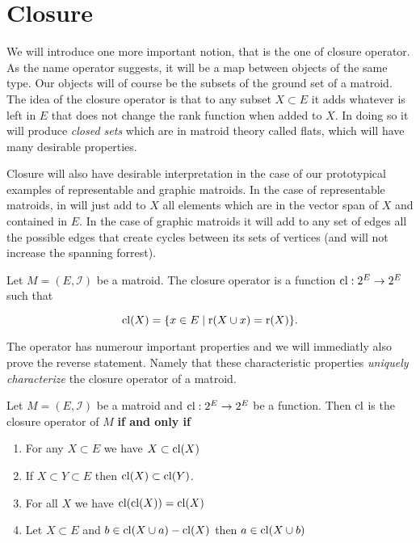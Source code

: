 \section{Closure}


We will introduce one more important notion, that is the one of closure operator. As the name operator suggests, it will be a map between objects of the same type. Our objects will of course be the subsets of the ground set of a matroid. The idea of the closure operator is that to any subset $X \subset E$ it adds whatever is left in $E$ that does not change the rank function when added to $X$. In doing so it will produce \textit{closed sets} which are in matroid theory called flats, which will have many desirable properties. 

Closure will also have desirable interpretation in the case of our prototypical examples of representable and graphic matroids. In the case of representable matroids, in will just add to $X$ all elements which are in the vector span of $X$ and contained in $E$. In the case of graphic matroids it will add to any set of edges all the possible edges that create cycles between its sets of vertices (and will not increase the spanning forrest).

\begin{defn}
    Let $M = (E, \mathcal{I})$ be a matroid. The closure operator is a function $\mathrm{cl}: 2^E \to 2^E$ such that

    $$\mathrm{cl}(X) = \{x \in E\; | \; \text{r}(X \cup x) = \text{r}(X) \}.$$

    
\end{defn}

The operator has numerour important properties and we will immediatly also prove the reverse statement. Namely that these characteristic properties \textit{uniquely characterize} the closure operator of a matroid.

\begin{theorem}
Let $M = (E, \mathcal{I})$ be a matroid and $\mathrm{cl}: 2^E \to 2^E$ be a function. Then $\mathrm{cl}$ is the closure operator of $M$ \textbf{if and only if}

\begin{enumerate}
    \item For any $X \subset E$ we have $X \subset \mathrm{cl} (X)$
    \item If $X \subset Y \subset E$ then $\mathrm{cl}(X) \subset \mathrm{cl}(Y)$.
    \item For all $X$ we have $\mathrm{cl}(\mathrm{cl}(X)) = \mathrm{cl}(X)$

    \item Let $X \subset E$ and $b \in 
    \mathrm{cl}(X \cup a) - \mathrm{cl}(X)$ then $a \in \mathrm{cl}(X \cup b)$
\end{enumerate}
\end{theorem}


